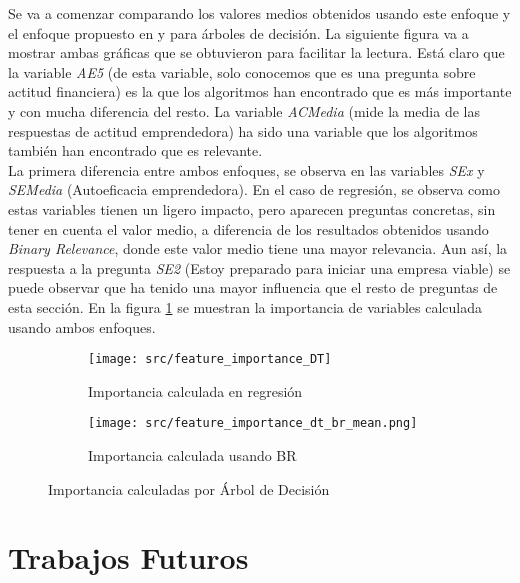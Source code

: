 Se va a comenzar comparando los valores medios obtenidos usando este enfoque y el enfoque propuesto en  y para árboles de decisión.
La siguiente figura va a mostrar ambas gráficas que se obtuvieron para facilitar la lectura.
Está claro que la variable \textit{AE5} (de esta variable, solo conocemos que es una pregunta sobre actitud financiera) es la que los algoritmos han encontrado que es más importante y con mucha diferencia del resto. La variable \textit{ACMedia} (mide la media de las respuestas de actitud emprendedora) ha sido una variable que los algoritmos también han encontrado que es relevante.\\
La primera diferencia entre ambos enfoques, se observa en las variables \textit{SEx} y \textit{SEMedia} (Autoeficacia emprendedora).
En el caso de regresión, se observa como estas variables tienen un ligero impacto, pero aparecen preguntas concretas, sin tener en cuenta el valor medio, a diferencia de los resultados obtenidos usando \textit{Binary Relevance}, donde este valor medio tiene una mayor relevancia. Aun así, la respuesta a la pregunta \textit{SE2} (Estoy preparado para iniciar una empresa viable) se puede observar que ha tenido una mayor influencia que el resto de preguntas de esta sección.
En la figura \ref{fig:dt_ft_cmp1} se muestran la importancia de variables calculada usando ambos enfoques.
\begin{figure}[H]
	\centering
	\begin{subfigure}[b]{\textwidth}
		\centering
		\texttt{[image: src/feature\_importance\_DT]}
		\caption{Importancia calculada en regresión}
	\end{subfigure}
	
	\begin{subfigure}[b]{\textwidth}
		\centering
		\texttt{[image: src/feature\_importance\_dt\_br\_mean.png]}
		\caption{Importancia calculada usando BR}
	\end{subfigure}
	\caption{Importancia calculadas por Árbol de Decisión}
	\label{fig:dt_ft_cmp1}
\end{figure}
\chapter{Trabajos Futuros}